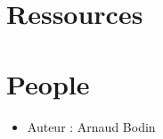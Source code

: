 \documentclass[class=report,crop=false, 12pt]{standalone}
\begin{document}
\section*{Ressources}


\section*{People}

\begin{itemize}
  \item Auteur : Arnaud Bodin
\end{itemize}
\end{document}
